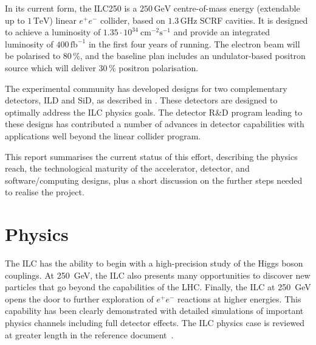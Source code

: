 \documentclass[%
 reprint,
 amsmath,amssymb,
 aps,
]{revtex4-1}
\def\ee{e^+e^-}
\begin{document}
In its current
form, the ILC250 is a $250\,{\mathrm{GeV}}$ centre-of-mass energy
(extendable up to $1\,{\mathrm{TeV}}$) linear $e^+e^-$ collider, based
on $1.3\,{\mathrm{GHz}}$  SCRF
cavities. It is designed to achieve a luminosity of $1.35\cdot
10^{34}~{\mathrm{cm}}^{-2}{\mathrm{s}}^{-1}$ and provide an integrated
luminosity of $400\,{\mathrm{fb}}^{-1}$ in the first four years of
running. The electron beam will be polarised to $80\,\%$, and the baseline plan includes an 
undulator-based
positron source which will  deliver
$30\,\%$ positron  polarisation. 


The experimental community has developed
designs for two complementary detectors, ILD and SiD, 
as described in \cite{Behnke:2013lya}. These detectors are designed to 
optimally address the
ILC physics goals.  The detector R\&D program leading to these designs
has 
contributed a number of advances in 
detector capabilities with applications well beyond the linear
collider program. 

This report summarises the current status of this effort, describing
the physics reach, the technological maturity of the accelerator,
detector, and software/computing designs,
plus a short discussion on the further steps 
 needed to realise the project.

\vspace{-.4cm}

\section{\label{sec:phys}Physics}

\vspace{-.3cm}

The ILC has the ability to begin with a high-precision study of the Higgs boson couplings.  At 250~GeV, the ILC also
presents many opportunities to discover new particles that go beyond
the capabilities of the LHC.  Finally, the ILC at 250~GeV opens the
door to further exploration of $\ee$ reactions at higher energies. This capability has been clearly demonstrated with detailed simulations of important physics channels including full detector effects. The ILC physics case is reviewed at greater length in the reference document~\cite{ILCforESS}.
\end{document}
